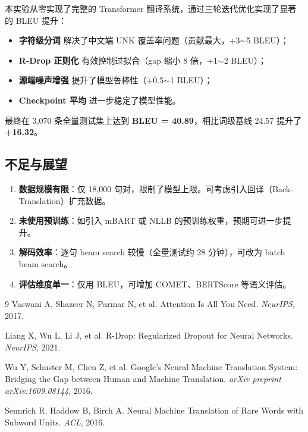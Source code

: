 \documentclass[12pt, a4paper]{ctexart}
\begin{document}
本实验从零实现了完整的 Transformer 翻译系统，通过三轮迭代优化实现了显著的 BLEU 提升：

\begin{itemize}[nosep]
  \item \textbf{字符级分词} 解决了中文端 UNK 覆盖率问题（贡献最大，+3$\sim$5 BLEU）；
  \item \textbf{R-Drop 正则化} 有效控制过拟合（gap 缩小 8 倍，+1$\sim$2 BLEU）；
  \item \textbf{源端噪声增强} 提升了模型鲁棒性（+0.5$\sim$1 BLEU）；
  \item \textbf{Checkpoint 平均} 进一步稳定了模型性能。
\end{itemize}

最终在 3,070 条全量测试集上达到 \textbf{BLEU = 40.89}，相比词级基线 24.57 提升了 \textbf{+16.32}。

\subsection{不足与展望}

\begin{enumerate}[nosep]
  \item \textbf{数据规模有限}：仅 18,000 句对，限制了模型上限。可考虑引入回译（Back-Translation）扩充数据。
  \item \textbf{未使用预训练}：如引入 mBART 或 NLLB 的预训练权重，预期可进一步提升。
  \item \textbf{解码效率}：逐句 beam search 较慢（全量测试约 28 分钟），可改为 batch beam search。
  \item \textbf{评估维度单一}：仅用 BLEU，可增加 COMET、BERTScore 等语义评估。
\end{enumerate}

\begin{thebibliography}{9}
  Vaswani A, Shazeer N, Parmar N, et al.
  Attention Is All You Need.
  \textit{NeurIPS}, 2017.

  Liang X, Wu L, Li J, et al.
  R-Drop: Regularized Dropout for Neural Networks.
  \textit{NeurIPS}, 2021.

  Wu Y, Schuster M, Chen Z, et al.
  Google's Neural Machine Translation System: Bridging the Gap between Human and Machine Translation.
  \textit{arXiv preprint arXiv:1609.08144}, 2016.

  Sennrich R, Haddow B, Birch A.
  Neural Machine Translation of Rare Words with Subword Units.
  \textit{ACL}, 2016.
\end{thebibliography}
\end{document}
